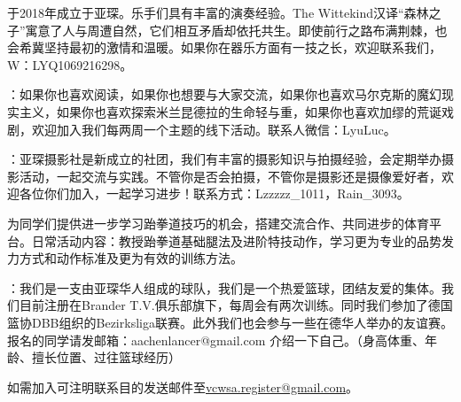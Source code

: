    于2018年成立于亚琛。乐手们具有丰富的演奏经验。The Wittekind汉译``森林之子''寓意了人与周遭自然，它们相互矛盾却依托共生。即使前行之路布满荆棘，也会希冀坚持最初的激情和温暖。如果你在器乐方面有一技之长，欢迎联系我们，W：LYQ1069216298。

    ：如果你也喜欢阅读，如果你也想要与大家交流，如果你也喜欢马尔克斯的魔幻现实主义，如果你也喜欢探索米兰昆德拉的生命轻与重，如果你也喜欢加缪的荒诞戏剧，欢迎加入我们每两周一个主题的线下活动。联系人微信：LyuLuc。

    ：亚琛摄影社是新成立的社团，我们有丰富的摄影知识与拍摄经验，会定期举办摄影活动，一起交流与实践。不管你是否会拍摄，不管你是摄影还是摄像爱好者，欢迎各位你们加入，一起学习进步！联系方式：Lzzzzz\_1011，Rain\_3093。

    为同学们提供进一步学习跆拳道技巧的机会，搭建交流合作、共同进步的体育平台。日常活动内容：教授跆拳道基础腿法及进阶特技动作，学习更为专业的品势发力方式和动作标准及更为有效的训练方法。

    ：我们是一支由亚琛华人组成的球队，我们是一个热爱篮球，团结友爱的集体。我们目前注册在Brander T.V.俱乐部旗下，每周会有两次训练。同时我们参加了德国篮协DBB组织的Bezirksliga联赛。此外我们也会参与一些在德华人举办的友谊赛。报名的同学请发邮箱：aachenlancer@gmail.com 介绍一下自己。（身高体重、年龄、擅长位置、过往篮球经历）

    如需加入可注明联系目的发送邮件至\href{mailto:vcwsa.register@gmail.com}{vcwsa.register@gmail.com}。
